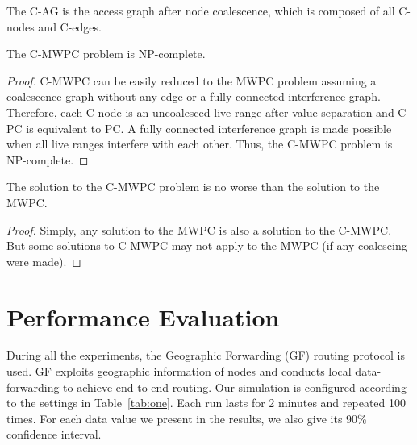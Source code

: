 \documentclass[format=acmsmall, review=false]{acmart}
\begin{document}
\begin{definition}The C-AG is the access
	graph after node coalescence, which is composed of all C-nodes and C-edges.
\end{definition}

\begin{lemma}
	The C-MWPC problem is NP-complete.
\end{lemma}
\begin{proof} C-MWPC can be easily reduced to the MWPC problem assuming a
	coalescence graph without any edge or a fully connected interference graph.
	Therefore, each C-node is an uncoalesced live range after value separation
	and C-PC is equivalent to PC. A fully connected interference graph is made
	possible when all live ranges interfere with each other. Thus, the C-MWPC
	problem is NP-complete.
\end{proof}

\begin{lemma}The solution to the C-MWPC problem is no
	worse than the solution to the MWPC.
\end{lemma}
\begin{proof}
	Simply, any solution to the MWPC is also a solution to the
	C-MWPC. But some solutions to C-MWPC may not apply to the MWPC (if any
	coalescing were made).
\end{proof}

\section{Performance Evaluation}

During all the experiments, the Geographic Forwarding (GF)
\cite{Akyildiz-01} routing protocol is used. GF exploits geographic
information of nodes and conducts local data-forwarding to achieve
end-to-end routing. Our simulation is configured according to the
settings in Table~\ref{tab:one}. Each run lasts for 2 minutes and
repeated 100 times. For each data value we present in the results, we
also give its 90\% confidence interval.
\end{document}
